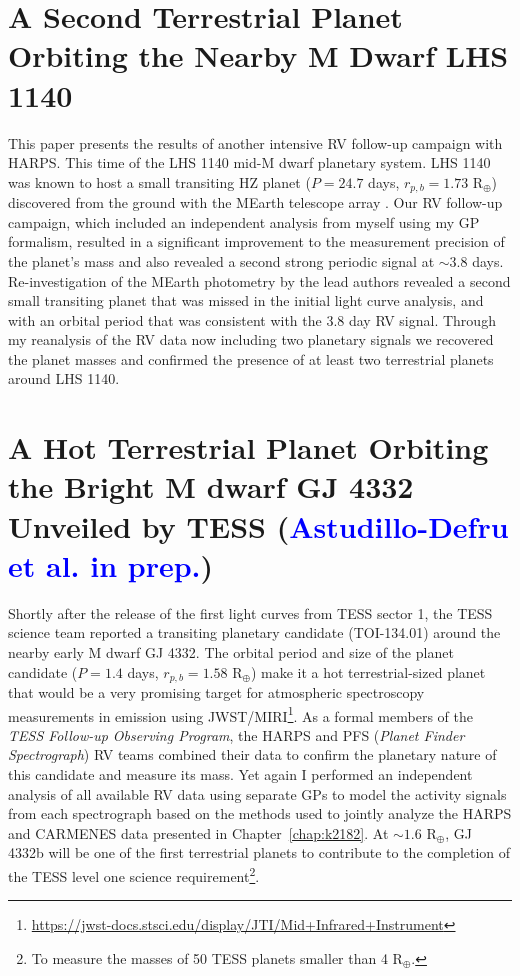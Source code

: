 \section{A Second Terrestrial Planet Orbiting the Nearby M Dwarf LHS 1140
  \citep{ment19}}
This paper presents the results of another intensive RV follow-up campaign with
HARPS. This time of the LHS 1140 mid-M dwarf planetary system. LHS 1140 was known to
host a small transiting HZ planet ($P=24.7$ days, $r_{p,b}=1.73$ R$_{\oplus}$)
discovered from the ground with the MEarth
telescope array \citep{dittmann17a}. Our RV follow-up campaign, which included
an independent analysis from myself using my GP formalism, resulted in a
significant improvement to the measurement precision of the planet's mass and
also revealed a second strong periodic signal at $\sim 3.8$ days. Re-investigation of
the MEarth photometry by the lead authors revealed a second small transiting
planet that was missed in the initial light curve analysis, and with an orbital
period that was consistent with the 3.8 day RV signal. Through my reanalysis of
the RV data now including two planetary signals we recovered the planet masses
and confirmed the presence of at least two terrestrial planets around LHS 1140.


\section{A Hot Terrestrial Planet Orbiting the Bright M dwarf GJ 4332 Unveiled
  by TESS (\textcolor{blue}{Astudillo-Defru et al. in prep.})}
Shortly after the release of the first light curves from TESS sector 1, the
TESS science team reported a transiting planetary candidate (TOI-134.01)
around the nearby early M dwarf GJ 4332.
The orbital period and size of the planet candidate
($P=1.4$ days, $r_{p,b}=1.58$ R$_{\oplus}$) make it a hot
terrestrial-sized planet that would be a very promising target for atmospheric
spectroscopy measurements in emission using JWST/MIRI\footnote{\url{https://jwst-docs.stsci.edu/display/JTI/Mid+Infrared+Instrument}}. As a formal members of
the \emph{TESS Follow-up Observing Program}, the HARPS and PFS
(\emph{Planet Finder Spectrograph}) RV teams combined their data to confirm the
planetary nature of this candidate and measure its mass. Yet again I
performed an independent analysis of all available RV data using separate GPs
to model the activity signals from each spectrograph based on the methods used
to jointly analyze the HARPS and CARMENES data presented in
Chapter~\ref{chap:k2182}. At $\sim 1.6$ R$_{\oplus}$, GJ 4332b will be one
of the first terrestrial planets to contribute to the completion of the TESS
level one science requirement\footnote{To measure the masses of 50 TESS planets
  smaller than 4 R$_{\oplus}$.}.


